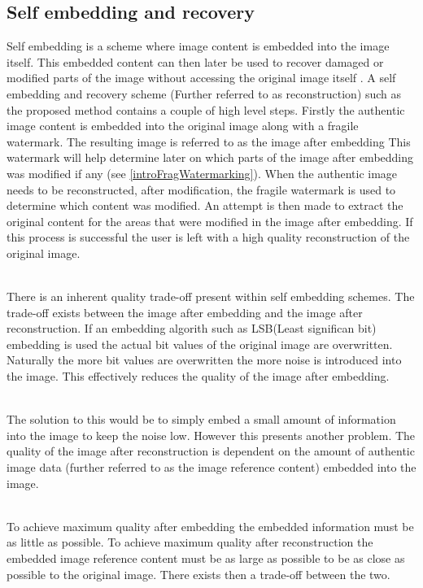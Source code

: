 \documentclass[12pt]{article}
\begin{document}
\subsection{Self embedding and recovery}
\label{introSelfEmbedRecovery}
Self embedding is a scheme where image content is embedded into the image itself. This embedded content can then later be used to recover damaged or modified parts of the image without accessing the original image itself \cite{fridrich1999images}.
A self embedding and recovery scheme (Further referred to as reconstruction) such as the proposed method contains a couple of high level steps.
Firstly the authentic image content is embedded into the original image along with a fragile watermark.
The resulting image is referred to as the image after embedding
This watermark will help determine later on which parts of the image after embedding was modified if any (see \ref{introFragWatermarking}).
When the authentic image needs to be reconstructed, after modification, the fragile watermark is used to determine which content was modified.
An attempt is then made to extract the original content for the areas that were modified in the image after embedding.
If this process is successful the user is left with a high quality reconstruction of the original image.

\hspace{0pt} \\
There is an inherent quality trade-off present within self embedding schemes.
The trade-off exists between the image after embedding and the image after reconstruction.
If an embedding algorith such as LSB(Least significan bit) embedding is used the actual bit values of the original image are overwritten.
Naturally the more bit values are overwritten the more noise is introduced into the image.
This effectively reduces the quality of the image after embedding.

\hspace{0pt} \\
The solution to this would be to simply embed a small amount of information into the image to keep the noise low.
However this presents another problem.
The quality of the image after reconstruction is dependent on the amount of authentic image data (further referred to as the image reference content) embedded into the image.

\hspace{0pt} \\
To achieve maximum quality after embedding the embedded information must be as little as possible.
To achieve maximum quality after reconstruction the embedded image reference content must be as large as possible to be as close as possible to the original image.
There exists then a trade-off between the two.
\end{document}
